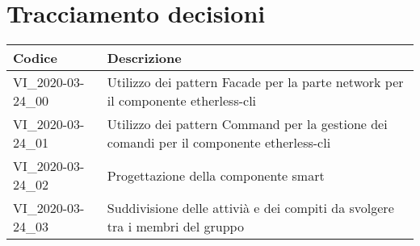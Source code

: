 \section{Tracciamento decisioni}
\renewcommand{\arraystretch}{1.8}

\begin{longtable}{|p{5cm}|p{8cm}|}
	\hline
	
	\rowcolor{header}
	\textbf{Codice} & \textbf{Descrizione} \\
	
	\hline
	
	VI\_2020-03-24\_00 & Utilizzo dei pattern Facade per la parte network per il componente etherless-cli\\ 
	VI\_2020-03-24\_01 & Utilizzo dei pattern Command per la gestione dei comandi per il componente etherless-cli\\ 
	VI\_2020-03-24\_02 & Progettazione della componente smart\\
	VI\_2020-03-24\_03 & Suddivisione delle attivià e dei compiti da svolgere tra i membri del gruppo \\
	\hline
\end{longtable}